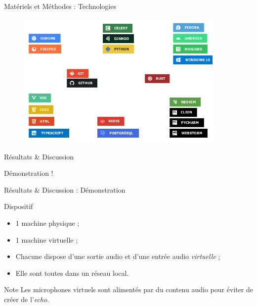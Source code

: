 \documentclass{beamer}
\begin{document}
\begin{frame}{Matériels et Méthodes : \small{Technologies}}
  \begin{figure}[H]
    \centering
    \includegraphics[width=0.9\textwidth]{tools}
\end{figure}
\end{frame}

\begin{frame}{Résultats \& Discussion}
  \begin{center}
    \Huge{Démonstration !}
  \end{center}
\end{frame}

\begin{frame}{Résultats \& Discussion : \small{Démonstration}}
  \begin{block}{Dispositif}
    \begin{itemize}
      \item 1 machine physique ;
      \item 1 machine virtuelle ;
      \item Chacune dispose d'une sortie audio et d'une entrée audio \textit{virtuelle} ;
      \item Elle sont toutes dans un réseau local.
    \end{itemize}
  \end{block}

  \begin{block}{Note}
    Les microphones virtuels sont alimentés par du contenu audio pour éviter de créer de l'\textit{echo}.
  \end{block}
\end{frame}
\end{document}
